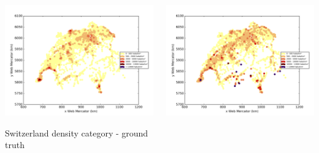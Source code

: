 \documentclass[c]{beamer}
\begin{document}
\begin{frame}
\begin{columns}
 \begin{column}{0.5\textwidth}
  \begin{overlayarea}{\linewidth}{4cm}
    \centering\vfill
    \includegraphics[scale=0.25]{../../data/Suisse/test/Nearest_Neighboors_Classification/Nearest_Neighboors_Classification/density_ground_truth.png}
  \end{overlayarea}
  \begin{overlayarea}{\linewidth}{0.5cm}
    \centering
    \tiny Switzerland density category - ground truth\par
  \end{overlayarea}
 \end{column}
 \begin{column}{0.5\textwidth}
  \begin{overlayarea}{\linewidth}{4cm}
    \centering\vfill
    \includegraphics[scale=0.25]{../../data/Suisse/test/Nearest_Neighboors_Classification/Nearest_Neighboors_Classification/density_classification.png}

\end{overlayarea}
\end{column}
\end{columns}
\end{frame}
\end{document}
